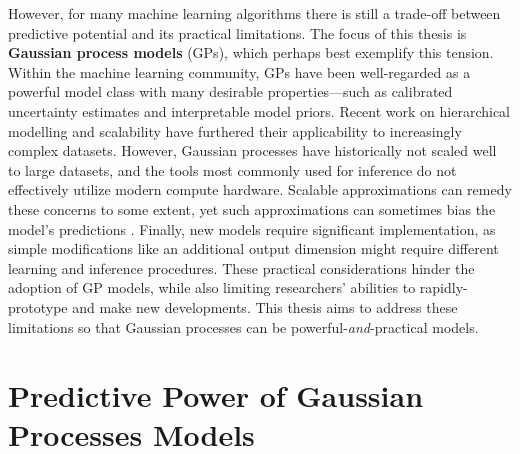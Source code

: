 However, for many machine learning algorithms there is still a trade-off between predictive potential and its practical limitations.
The focus of this thesis is {\bf Gaussian process models} (GPs), which perhaps best exemplify this tension.
Within the machine learning community, GPs have been well-regarded as a powerful model class with many desirable properties---such as calibrated uncertainty estimates and interpretable model priors.
Recent work on hierarchical modelling \citep[e.g.][]{damianou2013deep} and scalability \citep[e.g.][]{wilson2015kernel} have furthered their applicability to increasingly complex datasets.
However, Gaussian processes have historically not scaled well to large datasets, and the tools most commonly used for inference do not effectively utilize modern compute hardware.
Scalable approximations can remedy these concerns to some extent, yet such approximations can sometimes bias the model's predictions \cite{turner2011two,bauer2016understanding}.
Finally, new models require significant implementation, as simple modifications like an additional output dimension might require different learning and inference procedures.
These practical considerations hinder the adoption of GP models, while also limiting researchers' abilities to rapidly-prototype and make new developments.
This thesis aims to address these limitations so that Gaussian processes can be powerful-\emph{and}-practical models.


\section{Predictive Power of Gaussian Processes Models}

